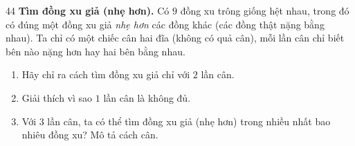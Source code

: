 \begin{probbox}{44}{}
\textbf{Tìm đồng xu giả (nhẹ hơn).} Có $9$ đồng xu trông giống hệt nhau, trong đó có đúng một đồng xu giả \emph{nhẹ hơn} các đồng
khác (các đồng thật nặng bằng nhau). Ta chỉ có một chiếc cân hai đĩa (không có quả cân), mỗi lần cân chỉ biết bên nào nặng hơn
hay hai bên bằng nhau.
\begin{enumerate}[label=\alph*),leftmargin=1.6em,itemsep=1pt,topsep=2pt]
  \item Hãy chỉ ra cách tìm đồng xu giả chỉ với $2$ lần cân.
  \item Giải thích vì sao $1$ lần cân là không đủ.
  \item Với $3$ lần cân, ta có thể tìm đồng xu giả (nhẹ hơn) trong nhiều nhất bao nhiêu đồng xu? Mô tả cách cân.
\end{enumerate}
\end{probbox}
